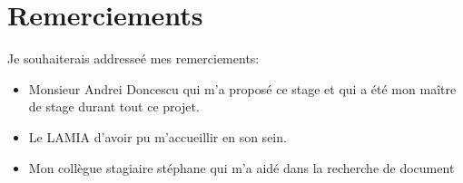 \chapter{Remerciements}\label{Remerciements}
Je souhaiterais addresseé mes remerciements:
\begin{itemize}
  \item Monsieur Andrei Doncescu qui m'a proposé ce stage et qui a été mon maître de stage durant tout ce projet.
  \item Le LAMIA d'avoir pu m'accueillir en son sein.
  \item Mon collègue stagiaire stéphane qui m'a aidé dans la recherche de document
\end{itemize}
